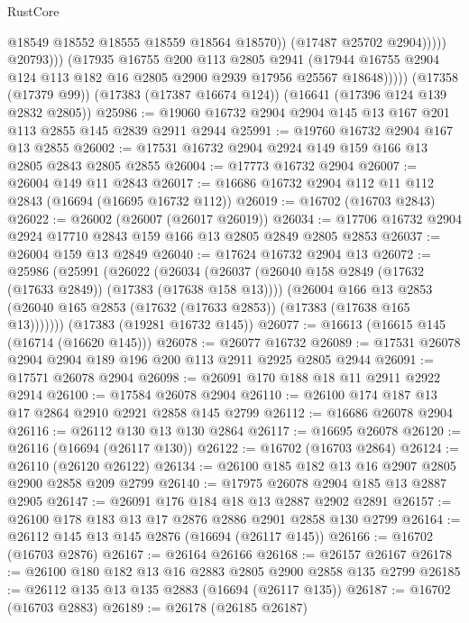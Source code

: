\begin{lexlean}{RustCore}
\begin{coremodule}
                            @18549
                            @18552
                            @18555
                            @18559
                            @18564
                            @18570))
                        (@17487 @25702 @2904)))))
                @20793)))
          (@17935
            @16755
            @200
            @113
            @2805
            @2941
            (@17944 @16755 @2904 @124 @113 @182 @16 @2805 @2900 @2939 @17956 @25567 @18648)))))
    (@17358 (@17379 @99))
    (@17383 (@17387 @16674 @124))
    (@16641 (@17396 @124 @139 @2832 @2805))
@25986 := @19060 @16732 @2904 @2904 @145 @13 @167 @201 @113 @2855 @145 @2839 @2911 @2944
@25991 := @19760 @16732 @2904 @167 @13 @2855
@26002 := @17531 @16732 @2904 @2924 @149 @159 @166 @13 @2805 @2843 @2805 @2855
@26004 := @17773 @16732 @2904
@26007 := @26004 @149 @11 @2843
@26017 := @16686 @16732 @2904 @112 @11 @112 @2843 (@16694 (@16695 @16732 @112))
@26019 := @16702 (@16703 @2843)
@26022 := @26002 (@26007 (@26017 @26019))
@26034 := @17706 @16732 @2904 @2924 @17710 @2843 @159 @166 @13 @2805 @2849 @2805 @2853
@26037 := @26004 @159 @13 @2849
@26040 := @17624 @16732 @2904 @13
@26072 := @25986
    (@25991
      (@26022
        (@26034
          (@26037 (@26040 @158 @2849 (@17632 (@17633 @2849)) (@17383 (@17638 @158 @13))))
          (@26004
            @166
            @13
            @2853
            (@26040 @165 @2853 (@17632 (@17633 @2853)) (@17383 (@17638 @165 @13)))))))
    (@17383 (@19281 @16732 @145))
@26077 := @16613 (@16615 @145 (@16714 (@16620 @145)))
@26078 := @26077 @16732
@26089 := @17531 @26078 @2904 @2904 @189 @196 @200 @113 @2911 @2925 @2805 @2944
@26091 := @17571 @26078 @2904
@26098 := @26091 @170 @188 @18 @11 @2911 @2922 @2914
@26100 := @17584 @26078 @2904
@26110 := @26100 @174 @187 @13 @17 @2864 @2910 @2921 @2858 @145 @2799
@26112 := @16686 @26078 @2904
@26116 := @26112 @130 @13 @130 @2864
@26117 := @16695 @26078
@26120 := @26116 (@16694 (@26117 @130))
@26122 := @16702 (@16703 @2864)
@26124 := @26110 (@26120 @26122)
@26134 := @26100 @185 @182 @13 @16 @2907 @2805 @2900 @2858 @209 @2799
@26140 := @17975 @26078 @2904 @185 @13 @2887 @2905
@26147 := @26091 @176 @184 @18 @13 @2887 @2902 @2891
@26157 := @26100 @178 @183 @13 @17 @2876 @2886 @2901 @2858 @130 @2799
@26164 := @26112 @145 @13 @145 @2876 (@16694 (@26117 @145))
@26166 := @16702 (@16703 @2876)
@26167 := @26164 @26166
@26168 := @26157 @26167
@26178 := @26100 @180 @182 @13 @16 @2883 @2805 @2900 @2858 @135 @2799
@26185 := @26112 @135 @13 @135 @2883 (@16694 (@26117 @135))
@26187 := @16702 (@16703 @2883)
@26189 := @26178 (@26185 @26187)

\end{coremodule}
\end{lexlean}
